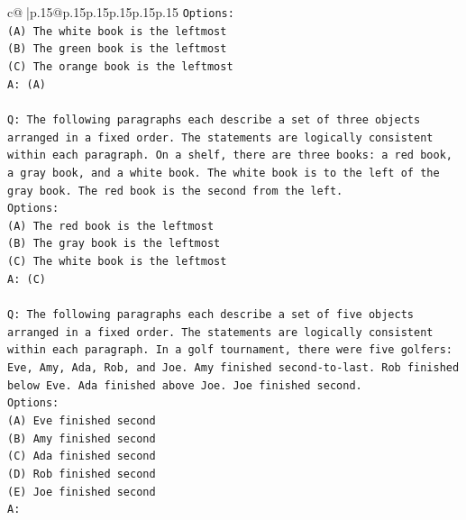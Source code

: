 \documentclass{article}
\begin{document}
{\begin{supertabular}{c@{$\;$}|p{.15\linewidth}@{}p{.15\linewidth}p{.15\linewidth}p{.15\linewidth}p{.15\linewidth}p{.15\linewidth}}
{{{\texttt{Options:} \\
\texttt{(A) The white book is the leftmost} \\
\texttt{(B) The green book is the leftmost} \\
\texttt{(C) The orange book is the leftmost} \\
\texttt{A: (A)} \\
\\ 
\texttt{Q: The following paragraphs each describe a set of three objects arranged in a fixed order. The statements are logically consistent within each paragraph. On a shelf, there are three books: a red book, a gray book, and a white book. The white book is to the left of the gray book. The red book is the second from the left.} \\
\texttt{Options:} \\
\texttt{(A) The red book is the leftmost} \\
\texttt{(B) The gray book is the leftmost} \\
\texttt{(C) The white book is the leftmost} \\
\texttt{A: (C)} \\
\\ 
\texttt{Q: The following paragraphs each describe a set of five objects arranged in a fixed order. The statements are logically consistent within each paragraph. In a golf tournament, there were five golfers: Eve, Amy, Ada, Rob, and Joe. Amy finished second{-}to{-}last. Rob finished below Eve. Ada finished above Joe. Joe finished second.} \\
\texttt{Options:} \\
\texttt{(A) Eve finished second} \\
\texttt{(B) Amy finished second} \\
\texttt{(C) Ada finished second} \\
\texttt{(D) Rob finished second} \\
\texttt{(E) Joe finished second} \\
\texttt{A:} \\
            }
        }
    }
     \\ \\


\end{supertabular}}
\end{document}
